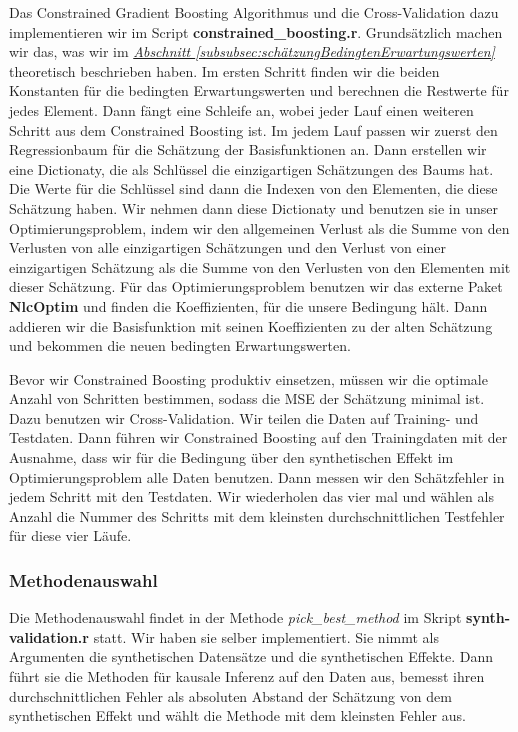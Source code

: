 \documentclass[12pt,a4paper,twoside]{scrartcl}
\numberwithin{equation}{section}
\newcommand{\refsec}[1]{\emph{\hyperref[#1]{Abschnitt \ref*{#1} }}}
\begin{document}
Das Constrained Gradient Boosting Algorithmus und die Cross-Validation dazu implementieren wir im Script \textbf{constrained\_boosting.r}. Grundsätzlich machen wir das, was wir im \refsec{subsubsec:schätzungBedingtenErwartungswerten} theoretisch beschrieben haben. Im ersten Schritt finden wir die beiden Konstanten für die bedingten Erwartungswerten und berechnen die Restwerte für jedes Element. Dann fängt eine Schleife an, wobei jeder Lauf einen weiteren Schritt aus dem Constrained Boosting ist. Im jedem Lauf passen wir zuerst den Regressionbaum für die Schätzung der Basisfunktionen an. Dann erstellen wir eine Dictionaty, die als Schlüssel die einzigartigen Schätzungen des Baums hat. Die Werte für die Schlüssel sind dann die Indexen von den Elementen, die diese Schätzung haben. Wir nehmen dann diese Dictionaty und benutzen sie in unser Optimierungsproblem, indem wir den allgemeinen Verlust als die Summe von den Verlusten von alle einzigartigen Schätzungen und den Verlust von einer einzigartigen Schätzung als die Summe von den Verlusten von den Elementen mit dieser Schätzung. Für das Optimierungsproblem benutzen wir das externe Paket \textbf{NlcOptim} und finden die Ko­ef­fi­zi­enten, für die unsere Bedingung hält. Dann addieren wir die Basisfunktion mit seinen Koeffizienten zu der alten Schätzung und bekommen die neuen bedingten Erwartungswerten.\par 

\noindent
Bevor wir Constrained Boosting produktiv einsetzen, müssen wir die optimale Anzahl von Schritten bestimmen, sodass die MSE der Schätzung minimal ist. Dazu benutzen wir Cross-Validation. Wir teilen die Daten auf Training- und Testdaten. Dann führen wir Constrained Boosting auf den Trainingdaten mit der Ausnahme, dass wir für die Bedingung über den synthetischen Effekt im Optimierungsproblem alle Daten benutzen. Dann messen wir den Schätzfehler in jedem Schritt mit den Testdaten. Wir wiederholen das vier mal und wählen als Anzahl die Nummer des Schritts mit dem kleinsten durchschnittlichen Testfehler für diese vier Läufe.\par  

\subsubsection{Methodenauswahl}\label{subsubsec:methodenauswahl}
Die Methodenauswahl findet in der Methode \emph{pick\_best\_method} im Skript \textbf{synth-validation.r} statt. Wir haben sie selber implementiert. Sie nimmt als Argumenten die synthetischen Datensätze und die synthetischen Effekte. Dann führt sie die Methoden für kausale Inferenz auf den Daten aus, bemesst ihren durchschnittlichen Fehler als absoluten Abstand der Schätzung von dem synthetischen Effekt und wählt die Methode mit dem kleinsten Fehler aus.\par 
\end{document}
